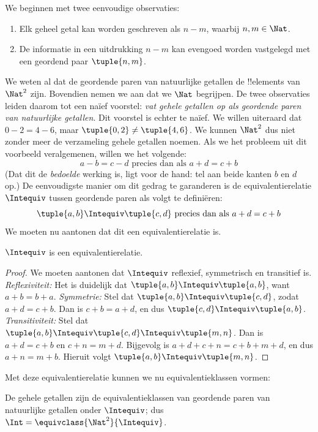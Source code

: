 \documentclass[openany]{memoir}
\begin{document}
We beginnen met twee eenvoudige observaties:
	\begin{enumerate}
		\item Elk geheel getal kan worden geschreven als $n - m$, waarbij $n, m \in\Nat$.
		\item De informatie in een uitdrukking $n - m$ kan evengoed worden vastgelegd met een geordend paar $\tuple{n, m}$.
	\end{enumerate}
We weten al dat de geordende paren van natuurlijke getallen de !!{element}s
van $\Nat^2$ zijn. Bovendien nemen we aan dat we $\Nat$ begrijpen. De
twee observaties leiden daarom tot een na\"{i}ef voorstel: \emph{vat
gehele getallen op als geordende paren van natuurlijke getallen}.
Dit voorstel is echter te na\"{i}ef. We willen uiteraard dat $0- 2 = 4
- 6$, maar $\tuple{0, 2 }\neq \tuple{4, 6}$. We kunnen $\Nat^2$ dus
niet zonder meer de verzameling gehele getallen noemen.
Als we het probleem uit dit voorbeeld veralgemenen, willen we het volgende:
	$$a - b = c - d \text{ precies dan als }a + d = c + b$$
(Dat dit de \emph{bedoelde} werking is, ligt voor de hand: tel aan beide
kanten $b$ en $d$ op.) De eenvoudigste manier om dit gedrag te
garanderen is de equivalentierelatie $\Intequiv$ tussen geordende paren
als volgt te definiëren:
$$\tuple{ a, b } \Intequiv \tuple{c, d}\text{ precies dan als }a + d = c + b$$
We moeten nu aantonen dat dit een equivalentierelatie is.
\begin{prop} $\Intequiv$ is een equivalentierelatie.
\end{prop}
	\begin{proof}
	We moeten aantonen dat $\Intequiv$ reflexief, symmetrisch en transitief is.
	\emph{Reflexiviteit:} Het is duidelijk dat $\tuple{a, b} \Intequiv \tuple{a, b}$,
	want $a + b = b + a$.
	\emph{Symmetrie:} Stel dat $\tuple{a, b} \Intequiv \tuple{c, d}$,
	zodat $a + d = c + b$. Dan is $c + b = a + d$, en dus
	$\tuple{c, d} \Intequiv \tuple{a, b}$.
	\emph{Transitiviteit:} Stel dat $\tuple{a, b} \Intequiv \tuple{c,
	d}\Intequiv \tuple{m, n}$. Dan is $a + d = c + b$ en $c + n = m +
	d$. Bijgevolg is $a + d + c + n = c + b + m + d$, en dus $a + n =
	m + b$. Hieruit volgt $\tuple{a, b } \Intequiv \tuple{m, n}$.
\end{proof}
Met deze equivalentierelatie kunnen we nu equivalentieklassen vormen:
\begin{defn}
		De gehele getallen zijn de equivalentieklassen van geordende paren
		van natuurlijke getallen onder $\Intequiv$; dus $\Int =
		\equivclass{\Nat^2}{\Intequiv}$.
\end{defn}
\end{document}
